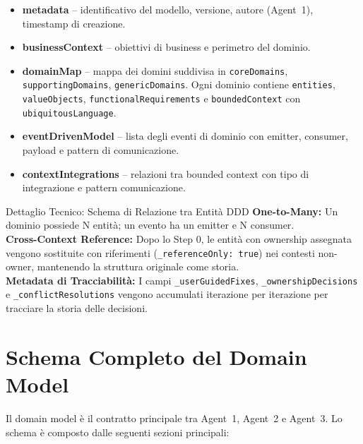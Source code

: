 \documentclass[12pt,a4paper]{report}
\begin{document}
\begin{itemize}
  \item \textbf{metadata} -- identificativo del modello, versione, autore (Agent~1),
        timestamp di creazione.
  \item \textbf{businessContext} -- obiettivi di business e perimetro del dominio.
  \item \textbf{domainMap} -- mappa dei domini suddivisa in
        \texttt{coreDomains}, \texttt{supportingDomains}, \texttt{genericDomains}.
        Ogni dominio contiene \texttt{entities}, \texttt{valueObjects},
        \texttt{functionalRequirements} e \texttt{boundedContext} con
        \texttt{ubiquitousLanguage}.
  \item \textbf{eventDrivenModel} -- lista degli eventi di dominio con emitter,
        consumer, payload e pattern di comunicazione.
  \item \textbf{contextIntegrations} -- relazioni tra bounded context con
        tipo di integrazione e pattern comunicazione.
\end{itemize}

\begin{technicalbox}{Dettaglio Tecnico: Schema di Relazione tra Entità DDD}
\textbf{One-to-Many:} Un dominio possiede N entità; un evento ha un emitter
e N consumer. \\
\textbf{Cross-Context Reference:} Dopo lo Step 0, le entità con ownership
assegnata vengono sostituite con riferimenti (\texttt{\_referenceOnly: true})
nei contesti non-owner, mantenendo la struttura originale come storia. \\
\textbf{Metadata di Tracciabilità:} I campi \texttt{\_userGuidedFixes},
\texttt{\_ownershipDecisions} e \texttt{\_conflictResolutions} vengono
accumulati iterazione per iterazione per tracciare la storia delle decisioni.
\end{technicalbox}

\section{Schema Completo del Domain Model}

Il domain model è il contratto principale tra Agent~1, Agent~2 e Agent~3.
Lo schema è composto dalle seguenti sezioni principali:
\end{document}

